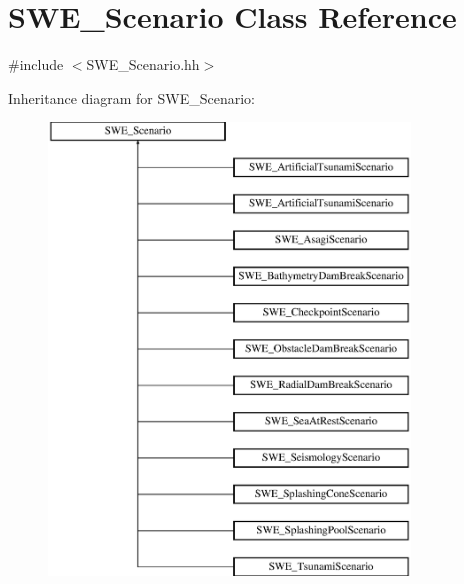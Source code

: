 \hypertarget{classSWE__Scenario}{\section{S\-W\-E\-\_\-\-Scenario Class Reference}
\label{classSWE__Scenario}
}


{\ttfamily \#include $<$S\-W\-E\-\_\-\-Scenario.\-hh$>$}

Inheritance diagram for S\-W\-E\-\_\-\-Scenario\-:\begin{figure}[H]
\begin{center}
\leavevmode
\includegraphics[height=12.000000cm]{classSWE__Scenario}
\end{center}
\end{figure}
